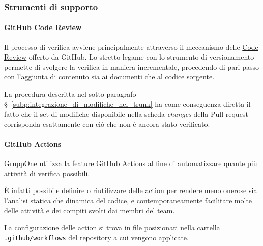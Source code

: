 \documentclass[../../norme-di-progetto.tex]{subfiles}
\begin{document}

\subsubsection{Strumenti di supporto}%
\label{subs:verifica/strumenti}

\paragraph{GitHub Code Review}%
\label{par:code_review}

Il processo di verifica avviene principalmente attraverso il meccanismo delle \href{https://github.com/features/code-review/}{Code Review} offerto da GitHub.
Lo stretto legame con lo strumento di versionamento permette di svolgere la verifica in maniera incrementale, procedendo di pari passo con l'aggiunta di contenuto sia ai documenti che al codice sorgente.

La procedura descritta nel sotto-paragrafo §~\ref{subp:integrazione_di_modifiche_nel_trunk} ha come conseguenza diretta il fatto che il set di modifiche disponibile nella scheda \textit{changes} della Pull request corrisponda esattamente con ciò che non è ancora stato verificato.


\paragraph{GitHub Actions}%
\label{par:github_actions}

GruppOne utilizza la feature \href{https://help.github.com/en/actions/automating-your-workflow-with-github-actions/about-github-actions}{GitHub Actions} al fine di automatizzare quante più attività di verifica possibili.

È infatti possibile definire o riutilizzare delle action per rendere meno onerose sia l'analisi statica che dinamica del codice, e contemporaneamente facilitare molte delle attività e dei compiti svolti dai membri del team.

La configurazione delle action si trova in file  posizionati nella cartella \verb|.github/workflows| del repository a cui vengono applicate.


\end{document}
